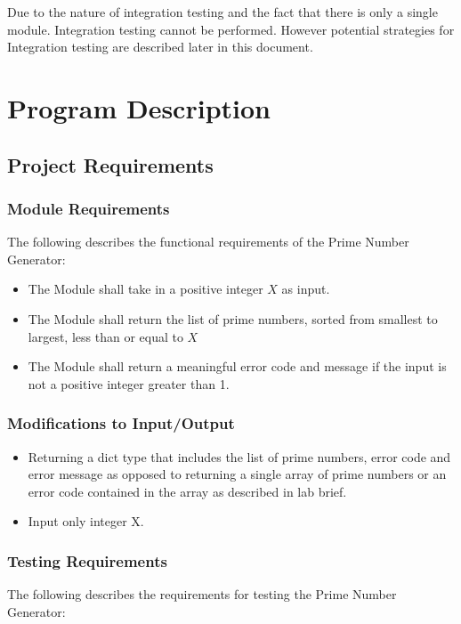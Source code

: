 \documentclass[]{article}
\begin{document}
Due to the nature of integration testing and the fact that there is only a single module. Integration testing cannot be performed. However potential strategies for Integration testing are described later in this document.



\section{Program Description}

\subsection{Project Requirements}

\subsubsection{Module Requirements}
The following describes the functional requirements of the Prime Number Generator:

\begin{itemize}
	\item The Module shall take in a positive integer $X$ as input.
	
	\item The Module shall return the list of prime numbers, sorted from smallest to largest, less than or equal to $X$  

	\item The Module shall return a meaningful error code and message if the input is not a positive integer greater than 1.
\end{itemize}

\subsubsection{Modifications to Input/Output}
\begin{itemize}
    \item Returning a dict type that includes the list of prime numbers, error code and error message as opposed to returning a single array of prime numbers or an error code contained in the array as described in lab brief.
    \item Input only integer X.

\end{itemize}
\subsubsection{Testing Requirements}
The following describes the requirements for testing the Prime Number Generator:
\end{document}

